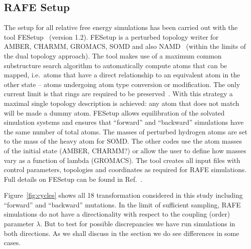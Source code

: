 \documentclass[journal=jctcce,manuscript=article]{achemso}
\begin{document}
\subsection{RAFE Setup}
\label{sec:rafe_setup}

The setup for all relative free energy simulations has been carried
out with the tool FESetup~\cite{loeffler_fesetup:_2015} (version
1.2).  FESetup is a perturbed topology writer for AMBER, CHARMM,
GROMACS, SOMD and also NAMD~\cite{JCC:JCC20289} (within the
limits of the dual topology approach).  The tool makes use of a
maximum common substructure search algorithm to automatically compute
atoms that can be mapped, i.e.\ atoms that have a direct relationship
to an equivalent atom in the other state -- atoms undergoing atom type conversion or modification.  The only current limit is that rings are
required to be preserved~\cite{doi:10.1021/acs.jcim.5b00057}.  With this
strategy a maximal single topology description is achieved: any atom that
does not match will be made a dummy atom.  FESetup allows
equilibration of the solvated simulation systems and ensures that
``forward'' and ``backward'' simulations have the same number of
total atoms.  The masses of perturbed hydrogen atoms are set to the mass of the heavy atom for SOMD.
  The other codes use the atom masses of the initial state (AMBER, CHARMM?) or allow the user to define how masses vary as a function of lambda (GROMACS).
The tool creates all input files with control
parameters, topologies and coordinates as required for RAFE
simulations.  Full details on FESetup can be found in
Ref.~.

Figure~\ref{fig:cycles} shows all 18 transformation considered in this
study including ``forward'' and ``backward'' mutations.  In the limit of sufficient sampling, RAFE simulations do not have a directionality with respect to the coupling (order) parameter $\lambda$. But to test for possible discrepancies we have run 
simulations in both directions.  As we shall discuss in the 
 section we do see differences in some cases.
\end{document}

